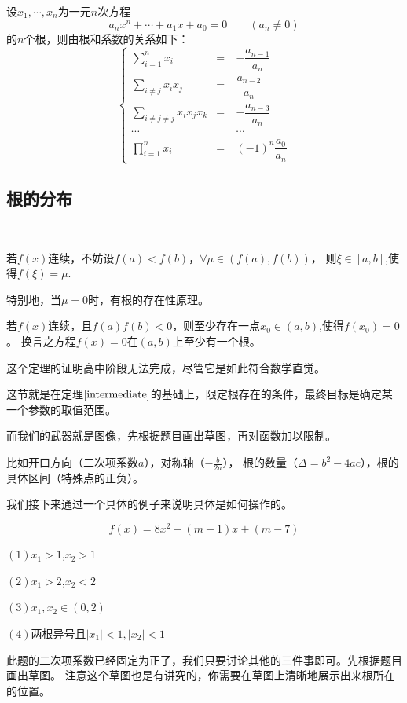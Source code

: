 \begin{theorem}[Vieta定理]
    设\(x_1,\cdots,x_n\)为一元\(n\)次方程
    \begin{equation}
        a_nx^n+\cdots+a_1x+a_0=0\qquad(a_n\neq0)
    \end{equation}的\(n\)个根，则由根和系数的关系如下：
    \[
        \left\{
        \begin{array}{ccc}
          \displaystyle\sum_{i=1}^{n}x_i& = &-\dfrac{a_{n-1}}{a_n} \\
          \displaystyle\sum_{i\neq j}x_ix_j   & = &\dfrac{a_{n-2}}{a_n}\\
          \displaystyle\sum_{i\neq j\neq j}x_ix_jx_k&=&-\dfrac{a_{n-3}}{a_n}\\
          \cdots&\quad&\cdots\\
          \displaystyle\prod_{i=1}^{n}x_i&=&(-1)^n\dfrac{a_0}{a_n} 
        \end{array}
        \right.
        \]






\end{theorem}
\clearpage
\subsection{根的分布}
\begin{theorem}[介值性]\label{intermediate}
    \ 

    若$f(x)$连续，不妨设$f(a)<f(b)$，$\forall \mu \in(f(a),f(b))$，
    则$\xi \in [a,b]$,使得$f(\xi)=\mu$.

    特别地，当$\mu=0$时，有根的存在性原理。

    若$f(x)$连续，且$f(a)f(b)<0$，则至少存在一点$x_0 \in (a,b)$,使得$f(x_0)=0$。
    换言之方程$f(x)=0$在$(a,b)$上至少有一个根。
\end{theorem}
\begin{zhu}
    这个定理的证明高中阶段无法完成，尽管它是如此符合数学直觉。
\end{zhu}

这节就是在定理$\ref*{intermediate}$的基础上，限定根存在的条件，最终目标是确定某一个参数的取值范围。

而我们的武器就是图像，先根据题目画出草图，再对函数加以限制。

比如开口方向（二次项系数$a$），对称轴（$-\frac{b}{2a}$），
根的数量（$\Delta=b^2-4ac$），根的具体区间（特殊点的正负）。

我们接下来通过一个具体的例子来说明具体是如何操作的。
\begin{example}\label{example 2.3.1}
    \[f(x)=8x^2-(m-1)x+(m-7)\]

$(1)x_1>1$,$x_2>1$

$(2)x_1>2$,$x_2<2$

$(3)x_1,x_2\in (0,2)$

$(4)\text{两根异号且}|x_1|<1,|x_2|<1$
\end{example}
\begin{analyse}
此题的二次项系数已经固定为正了，我们只要讨论其他的三件事即可。先根据题目画出草图。
注意这个草图也是有讲究的，你需要在草图上清晰地展示出来根所在的位置。
\end{analyse}

